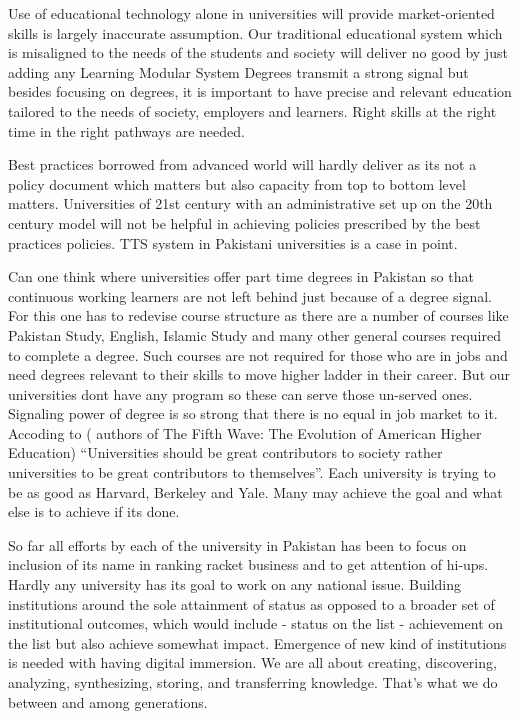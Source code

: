 \documentclass[
]{aft}
\begin{document}
Use of educational technology alone in universities will provide
market-oriented skills is largely inaccurate assumption. Our traditional
educational system which is misaligned to the needs of the students and
society will deliver no good by just adding any Learning Modular System
Degrees transmit a strong signal but besides focusing on degrees, it is
important to have precise and relevant education tailored to the needs
of society, employers and learners. Right skills at the right time in
the right pathways are needed.

Best practices borrowed from advanced world will hardly deliver as its
not a policy document which matters but also capacity from top to bottom
level matters. Universities of 21st century with an administrative set
up on the 20th century model will not be helpful in achieving policies
prescribed by the best practices policies. TTS system in Pakistani
universities is a case in point.

Can one think where universities offer part time degrees in Pakistan so
that continuous working learners are not left behind just because of a
degree signal. For this one has to redevise course structure as there
are a number of courses like Pakistan Study, English, Islamic Study and
many other general courses required to complete a degree. Such courses
are not required for those who are in jobs and need degrees relevant to
their skills to move higher ladder in their career. But our universities
dont have any program so these can serve those un-served ones. Signaling
power of degree is so strong that there is no equal in job market to it.
Accoding to \citet{CrowDabars2020} ( authors of The Fifth Wave: The
Evolution of American Higher Education) ``Universities should be great
contributors to society rather universities to be great contributors to
themselves''. Each university is trying to be as good as Harvard,
Berkeley and Yale. Many may achieve the goal and what else is to achieve
if its done.

So far all efforts by each of the university in Pakistan has been to
focus on inclusion of its name in ranking racket business and to get
attention of hi-ups. Hardly any university has its goal to work on any
national issue. Building institutions around the sole attainment of
status as opposed to a broader set of institutional outcomes, which
would include - status on the list - achievement on the list but also
achieve somewhat impact. Emergence of new kind of institutions is needed
with having digital immersion. We are all about creating, discovering,
analyzing, synthesizing, storing, and transferring knowledge. That's
what we do between and among generations.
\end{document}
